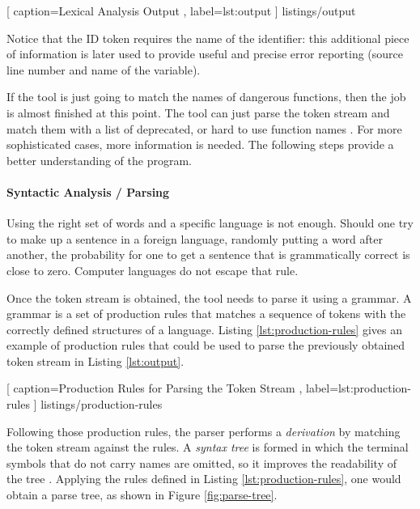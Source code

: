
    [
        caption=Lexical Analysis Output \cite{chess2007secure},
        label=lst:output
    ]
    {listings/output}
    
Notice that the ID token requires the name of the identifier: this additional piece of information is later used to provide useful and precise error reporting (source line number and name of the variable). 

If the tool is just going to match the names of dangerous functions, then the job is almost finished at this point. The tool can just parse the token stream and match them with a list of deprecated, or hard to use function names \cite{chess2007secure}. For more sophisticated cases, more information is needed. The following steps provide a better understanding of the program.

\paragraph{Syntactic Analysis / Parsing}

Using the right set of words and a specific language is not enough. Should one try to make up a sentence in a foreign language, randomly putting a word after another, the probability for one to get a sentence that is grammatically correct is close to zero. Computer languages do not escape that rule.

Once the token stream is obtained, the tool needs to parse it using a grammar. A grammar is a set of production rules that matches a sequence of tokens with the correctly defined structures of a language. Listing \ref{lst:production-rules} gives an example of production rules that could be used to parse the previously obtained token stream in Listing \ref{lst:output}.

\vspace{0.5cm}


    [
        caption=Production Rules for Parsing the Token Stream \cite{chess2007secure},
        label=lst:production-rules
    ]
    {listings/production-rules}
    
Following those production rules, the parser performs a \emph{derivation} by matching the token stream against the rules. A \emph{syntax tree} is formed in which the terminal symbols that do not carry names are omitted, so it improves the readability of the tree \cite{chess2007secure}. Applying the rules defined in Listing \ref{lst:production-rules}, one would obtain a parse tree, as shown in Figure \ref{fig:parse-tree}.

